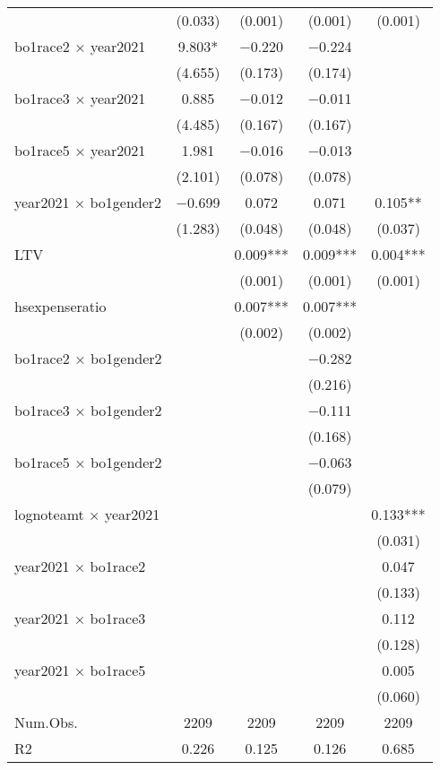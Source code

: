 \documentclass[12pt,english]{article}
\begin{document}
\begin{table}
{\begin{tabular}[t]{lcccc}
 & (\num{0.033}) & (\num{0.001}) & (\num{0.001}) & (\num{0.001})\\
bo1race2 × year2021 & \num{9.803}* & \num{-0.220} & \num{-0.224} & \\
 & (\num{4.655}) & (\num{0.173}) & (\num{0.174}) & \\
bo1race3 × year2021 & \num{0.885} & \num{-0.012} & \num{-0.011} & \\
 & (\num{4.485}) & (\num{0.167}) & (\num{0.167}) & \\
bo1race5 × year2021 & \num{1.981} & \num{-0.016} & \num{-0.013} & \\
 & (\num{2.101}) & (\num{0.078}) & (\num{0.078}) & \\
year2021 × bo1gender2 & \num{-0.699} & \num{0.072} & \num{0.071} & \num{0.105}**\\
 & (\num{1.283}) & (\num{0.048}) & (\num{0.048}) & (\num{0.037})\\
LTV &  & \num{0.009}*** & \num{0.009}*** & \num{0.004}***\\
 &  & (\num{0.001}) & (\num{0.001}) & (\num{0.001})\\
hsexpenseratio &  & \num{0.007}*** & \num{0.007}*** & \\
 &  & (\num{0.002}) & (\num{0.002}) & \\
bo1race2 × bo1gender2 &  &  & \num{-0.282} & \\
 &  &  & (\num{0.216}) & \\
bo1race3 × bo1gender2 &  &  & \num{-0.111} & \\
 &  &  & (\num{0.168}) & \\
bo1race5 × bo1gender2 &  &  & \num{-0.063} & \\
 &  &  & (\num{0.079}) & \\
lognoteamt × year2021 &  &  &  & \num{0.133}***\\
 &  &  &  & (\num{0.031})\\
year2021 × bo1race2 &  &  &  & \num{0.047}\\
 &  &  &  & (\num{0.133})\\
year2021 × bo1race3 &  &  &  & \num{0.112}\\
 &  &  &  & (\num{0.128})\\
year2021 × bo1race5 &  &  &  & \num{0.005}\\
 &  &  &  & (\num{0.060})\\
\midrule
Num.Obs. & \num{2209} & \num{2209} & \num{2209} & \num{2209}\\
R2 & \num{0.226} & \num{0.125} & \num{0.126} & \num{0.685}\\

\end{tabular}}
\end{table}
\end{document}
